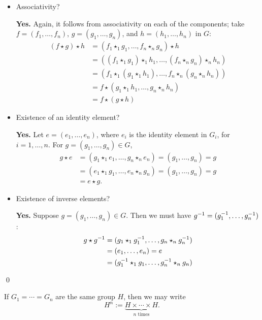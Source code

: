 \documentclass[../algebraNotesMSRI-UP2016.tex]{subfiles}
\begin{document}
\begin{frame}
\begin{itemize}
\item Associativity?

\textbf{Yes.}  Again, it follows from associativity on each of the components; take $f=(f_1,\dots,f_n)$, $g=(g_1,\dots,g_n)$, and $h=(h_1,\dots,h_n)$ in $G$:
\begin{align*}
(f\star g)\star h &= (f_1\star_1g_1,\dots,f_n\star_ng_n)\star h \\
	&= \left((f_1\star_1 g_1)\star_1 h_1,\dots,(f_n\star_n g_n)\star_n h_n\right) \\
	&=\left(f_1\star_1(g_1\star_1 h_1),\dots,f_n\star_n(g_n\star_n h_n)\right) \\
	&=f\star(g_1\star_1 h_1,\dots,g_n\star_n h_n) \\
	&=f\star (g\star h)
\end{align*}

\item Existence of an identity element?

\textbf{Yes.} Let $e=(e_1,\dots,e_n)$, where $e_i$ is the identity element in $G_i$, for $i=1,\dots,n$.  For $g=(g_1,\dots,g_n)\in G$,
\begin{align*}
g\star e &= (g_1\star_1 e_1,\dots,g_n\star_n e_n) =(g_1,\dots,g_n)=g \\
	&= (e_1\star_1 g_1,\dots, e_n\star_n g_n) = (g_1,\dots, g_n)=g \\
	&= e\star g.
\end{align*}
\end{itemize}
\end{frame}

\begin{frame}
\begin{itemize}
\item Existence of inverse elements?

\textbf{Yes.} Suppose $g=(g_1,\dots,g_n)\in G$.  Then we must have $g^{-1}=(g_1^{-1},\dots,g_n^{-1})$:
\begin{align*}
g\star g^{-1} &=(g_1\star_1 g_1^{-1},\dots,g_n\star_n g_n^{-1}) \\
	&= (e_1,\dots,e_n)=e \\
	&= (g_1^{-1}\star_1 g_1,\dots,g_n^{-1}\star_n g_n)
\end{align*}
\end{itemize}
\qed 

\smallGap
If $G_1=\cdots =G_n$ are the same group $H$, then we may write 
\[
H^n:=\underbrace{H\times \cdots \times H}_{\text{$n$ times}}. 
\]
\end{frame}
\end{document}
